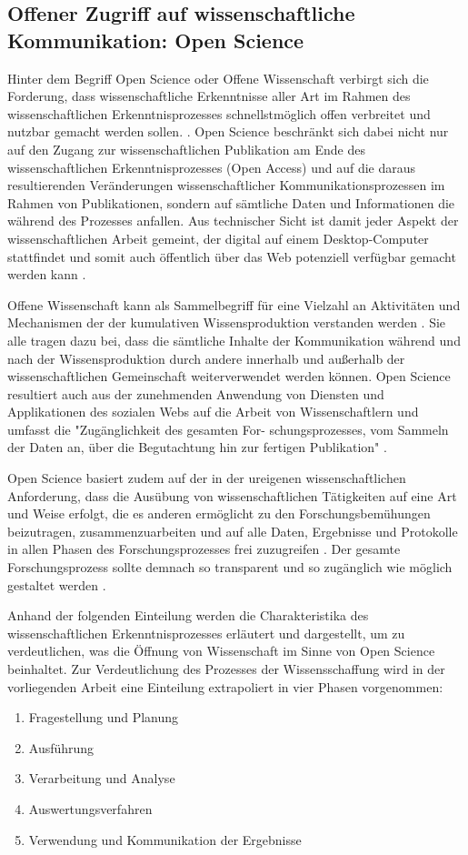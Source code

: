 \subsection{Offener Zugriff auf wissenschaftliche Kommunikation: Open Science}

Hinter dem Begriff Open Science oder Offene Wissenschaft verbirgt sich die Forderung, dass wissenschaftliche Erkenntnisse aller Art im Rahmen des wissenschaftlichen Erkenntnisprozesses schnellstmöglich offen verbreitet und nutzbar gemacht werden sollen. \cite{stafford_2010_science}. Open Science beschränkt sich dabei nicht nur auf den Zugang zur wissenschaftlichen Publikation am Ende des wissenschaftlichen Erkenntnisprozesses (Open Access) und auf die daraus resultierenden Veränderungen wissenschaftlicher Kommunikationsprozessen im Rahmen von Publikationen, sondern auf sämtliche Daten und Informationen die während des Prozesses anfallen. Aus technischer Sicht ist damit jeder Aspekt der wissenschaftlichen Arbeit gemeint, der digital auf einem Desktop-Computer stattfindet und somit auch öffentlich über das Web potenziell verfügbar gemacht werden kann \cite{mietchen2012wissenschaft}.

Offene Wissenschaft kann als Sammelbegriff für eine Vielzahl an Aktivitäten und Mechanismen der der kumulativen Wissensproduktion verstanden werden \cite{Mukherjee_2009}. Sie alle tragen dazu bei, dass die sämtliche Inhalte der Kommunikation während und nach der Wissensproduktion durch andere innerhalb und außerhalb der wissenschaftlichen Gemeinschaft weiterverwendet werden können. Open Science resultiert auch aus der zunehmenden Anwendung von Diensten und Applikationen des sozialen Webs auf die Arbeit von Wissenschaftlern und umfasst die "Zugänglichkeit des gesamten For- schungsprozesses, vom Sammeln der Daten an, über die Begutachtung hin zur fertigen Publikation" \cite{brembs2015open}.

Open Science basiert zudem auf der in der ureigenen wissenschaftlichen Anforderung, dass die Ausübung von wissenschaftlichen Tätigkeiten auf eine Art und Weise erfolgt, die es anderen ermöglicht zu den Forschungsbemühungen beizutragen, zusammenzuarbeiten und auf alle Daten, Ergebnisse und Protokolle in allen Phasen des Forschungsprozesses frei zuzugreifen \cite{RIN_2010_open_research}. Der gesamte Forschungsprozess sollte demnach so transparent und so zugänglich wie möglich gestaltet werden \cite{Scheliga_2014}.

Anhand der folgenden Einteilung werden die Charakteristika des wissenschaftlichen Erkenntnisprozesses erläutert und dargestellt, um zu verdeutlichen, was die Öffnung von Wissenschaft im Sinne von Open Science beinhaltet. Zur Verdeutlichung des Prozesses der Wissensschaffung wird in der vorliegenden Arbeit eine Einteilung extrapoliert in vier Phasen vorgenommen:
\begin{enumerate}
\item Fragestellung und Planung
\item Ausführung
\item Verarbeitung und Analyse
\item Auswertungsverfahren
\item Verwendung und Kommunikation der Ergebnisse
\end{enumerate}


